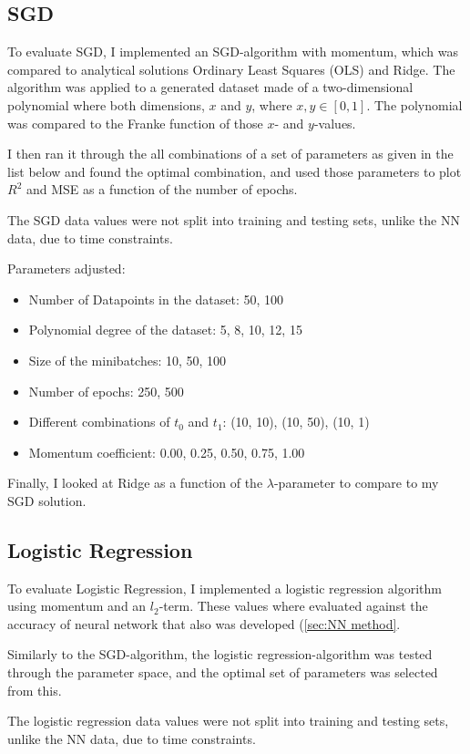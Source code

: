 \documentclass[a4paper, UKenglish]{article}
\newcommand{\0}{\mathbf{0}}
\newcommand{\1}{\mathbf{1}}
\begin{document}
\subsection{SGD} 
To evaluate SGD, I implemented an SGD-algorithm with momentum, which was compared to analytical solutions Ordinary Least Squares (OLS) and Ridge. The algorithm was applied to a generated dataset made of a two-dimensional polynomial where both dimensions, $x$ and $y$, where $x, y \in [0,1]$. The polynomial was compared to the Franke function of those $x$- and $y$-values.

I then ran it through the all combinations of a set of parameters as given in the list below and found the optimal combination, and used those parameters to plot $R^2$ and MSE as a function of the number of epochs.

The SGD data values were not split into training and testing sets, unlike the NN data, due to time constraints.

Parameters adjusted:
\begin{itemize}
\item Number of Datapoints in the dataset: 50, 100
\item Polynomial degree of the dataset: 5, 8, 10, 12, 15
\item Size of the minibatches: 10, 50, 100
\item Number of epochs: 250, 500
\item Different combinations of $t_0$ and $t_1$: (10, 10), (10, 50), (10, 1)
\item Momentum coefficient: 0.00, 0.25, 0.50, 0.75, 1.00
\end{itemize}

Finally, I looked at Ridge as a function of the $\lambda$-parameter to compare to my SGD solution.

\subsection{Logistic Regression}
To evaluate Logistic Regression, I implemented a logistic regression algorithm using momentum and an $l_2$-term. These values where evaluated against the accuracy of neural network that also was developed (\autoref{sec:NN method}.

Similarly to the SGD-algorithm, the logistic regression-algorithm was tested through the parameter space, and the optimal set of parameters was selected from this.

The logistic regression data values were not split into training and testing sets, unlike the NN data, due to time constraints.
\end{document}
